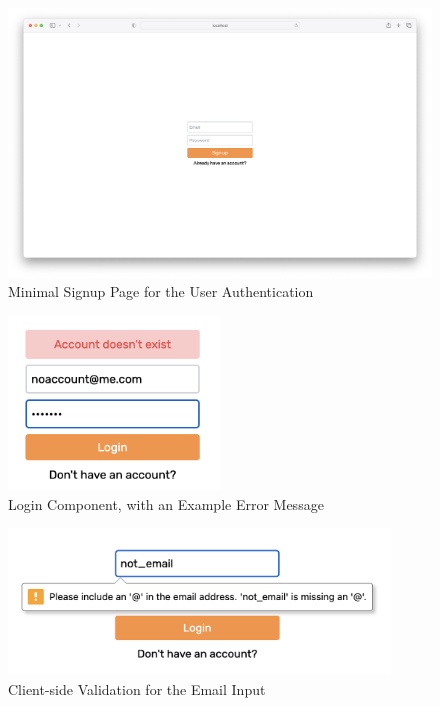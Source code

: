 \begin{figure}[H]
	\centering
	\includegraphics[width=\textwidth]{images/signup_page.png}
	\caption{Minimal Signup Page for the User Authentication}
	\label{fig:Signup_page}
\end{figure}

\begin{figure}[H]
	\centering
	\includegraphics[width=0.5\textwidth]{images/no_account.png}
	\caption{Login Component, with an Example Error Message}
	\label{fig:Login_component}
\end{figure}

\begin{figure}[H]
	\centering
	\includegraphics[width=0.9\textwidth]{images/email_validation.png}
	\caption{Client-side Validation for the Email Input}
	\label{fig:Email_validation}
\end{figure}

